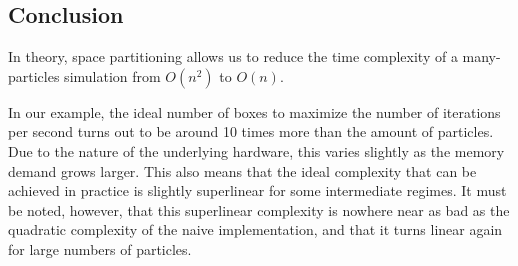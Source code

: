 


\subsection{Conclusion}
In theory, space partitioning allows us to reduce the time complexity of a 
many-particles simulation from $O(n^2)$ to $O(n)$.

In our example, the ideal number of boxes to maximize the number of 
iterations per second turns out to be around 10 times more than the amount of 
particles. Due to the nature of the underlying hardware, this varies slightly 
as the memory demand grows larger. This also means that the ideal complexity 
that can be achieved in practice is slightly superlinear for some intermediate 
regimes.  It must be noted, however, that this superlinear complexity is 
nowhere near as bad as the quadratic complexity of the naive implementation, 
and that it turns linear again for large numbers of particles.



